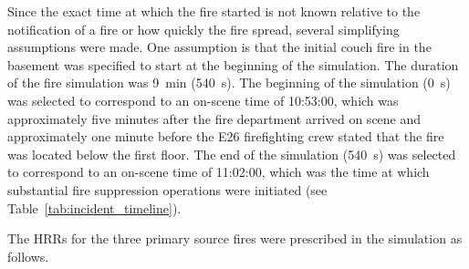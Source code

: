 \documentclass[12pt,oneside]{book}
\begin{document}
\clearpage


Since the exact time at which the fire started is not known relative to the notification of a fire or how quickly the fire spread, several simplifying assumptions were made. One assumption is that the initial couch fire in the basement was specified to start at the beginning of the simulation. The duration of the fire simulation was 9~min (540~s). The beginning of the simulation (0~s) was selected to correspond to an on-scene time of 10:53:00, which was approximately five minutes after the fire department arrived on scene and approximately one minute before the E26 firefighting crew stated that the fire was located below the first floor. The end of the simulation (540~s) was selected to correspond to an on-scene time of 11:02:00, which was the time at which substantial fire suppression operations were initiated (see Table~\ref{tab:incident_timeline}).

The HRRs for the three primary source fires were prescribed in the simulation as follows.
\end{document}
